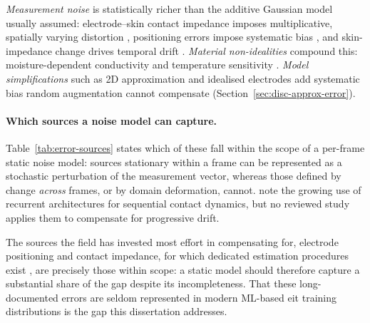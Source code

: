 \emph{Measurement noise} is statistically richer than the additive Gaussian model usually assumed: electrode--skin contact impedance imposes multiplicative, spatially varying distortion \parencite{vilhunen2002}, positioning errors impose systematic bias \parencite{kolehmainen1997}, and skin-impedance change drives temporal drift \parencite{boone1996}. \emph{Material non-idealities} compound this: moisture-dependent conductivity \parencite{park2022skin, tao2023} and temperature sensitivity \parencite{kim2024}. \emph{Model simplifications} such as 2D approximation and idealised electrodes \parencite{adler2006} add systematic bias random augmentation cannot compensate (Section~\ref{sec:disc-approx-error}).


\paragraph{Which sources a noise model can capture.} Table~\ref{tab:error-sources} states which of these fall within the scope of a per-frame static noise model: sources stationary within a frame can be represented as a stochastic perturbation of the measurement vector, whereas those defined by change \emph{across} frames, or by domain deformation, cannot. \textcite{shih2020} note the growing use of recurrent architectures for sequential contact dynamics, but no reviewed study applies them to compensate for progressive drift.

The sources the field has invested most effort in compensating for, electrode positioning and contact impedance, for which dedicated estimation procedures exist \parencite{kolehmainen1997, vilhunen2002}, are precisely those within scope: a static model should therefore capture a substantial share of the gap despite its incompleteness. That these long-documented errors are seldom represented in modern ML-based \gls{eit} training distributions is the gap this dissertation addresses.


